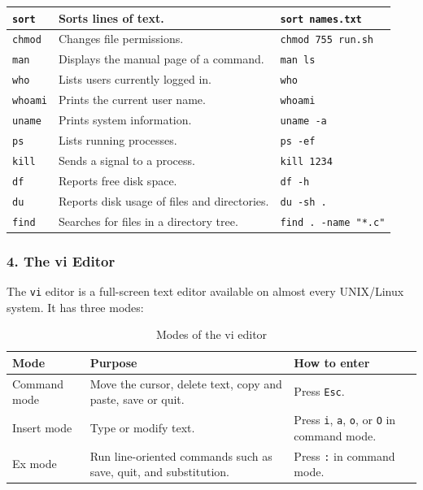 \begin{longtable}{|p{3.0cm}|p{7.9cm}|p{3.5cm}|}
\texttt{sort} & Sorts lines of text. & \texttt{sort names.txt} \\ \hline
\texttt{chmod} & Changes file permissions. & \texttt{chmod 755 run.sh} \\ \hline
\texttt{man} & Displays the manual page of a command. & \texttt{man ls} \\ \hline
\texttt{who} & Lists users currently logged in. & \texttt{who} \\ \hline
\texttt{whoami} & Prints the current user name. & \texttt{whoami} \\ \hline
\texttt{uname} & Prints system information. & \texttt{uname -a} \\ \hline
\texttt{ps} & Lists running processes. & \texttt{ps -ef} \\ \hline
\texttt{kill} & Sends a signal to a process. & \texttt{kill 1234} \\ \hline
\texttt{df} & Reports free disk space. & \texttt{df -h} \\ \hline
\texttt{du} & Reports disk usage of files and directories. & \texttt{du -sh .} \\ \hline
\texttt{find} & Searches for files in a directory tree. & \texttt{find . -name "*.c"} \\ \hline
\end{longtable}
\endgroup

\subsubsection*{4. The vi Editor}
The \texttt{vi} editor is a full-screen text editor available on almost every UNIX/Linux system. It has three modes:
\begin{table}[H]
\centering
\small
\begin{tabular}{|p{2.6cm}|p{7.2cm}|p{4.0cm}|}
\hline
\textbf{Mode} & \textbf{Purpose} & \textbf{How to enter} \\ \hline
Command mode & Move the cursor, delete text, copy and paste, save or quit. & Press \texttt{Esc}. \\ \hline
Insert mode & Type or modify text. & Press \texttt{i}, \texttt{a}, \texttt{o}, or \texttt{O} in command mode. \\ \hline
Ex mode & Run line-oriented commands such as save, quit, and substitution. & Press \texttt{:} in command mode. \\ \hline
\end{tabular}
\caption{Modes of the vi editor}
\end{table}

